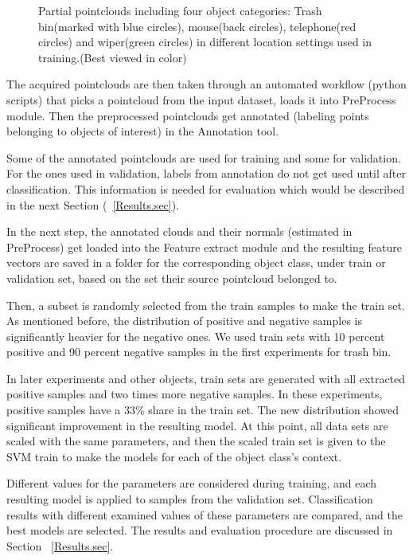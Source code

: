 \begin{figure} [htp]
\begin{center}
  \end{center}
  \caption[Train set pointclouds including four different object class.]
  {Partial pointclouds including four object categories: Trash bin(marked with blue circles), mouse(back circles), telephone(red circles) and wiper(green circles) in different location settings used in training.(Best viewed in color)}
  \label{TrainClouds2.figure:edge}
\end{figure}




The acquired pointclouds are then taken through an automated workflow (python scripts) that picks a pointcloud from the input dataset, loads it into PreProcess module. Then the preprocessed pointclouds get annotated (labeling points belonging to objects of interest) in the Annotation tool.

Some of the annotated pointclouds are used for training and some for validation. 
For the ones used in validation, labels from annotation do not get used until after classification. This information is needed for evaluation which would be described in the next Section (~\ref{Results.sec}).


In the next step, the annotated clouds and their normals (estimated in PreProcess) get loaded into the Feature extract module 
and the resulting feature vectors are saved in a folder for the corresponding object class, under train or validation set, based on the set their source pointcloud belonged to.

Then, a subset is randomly selected from the train samples to make the train set. As mentioned before, the distribution of positive and negative samples is significantly heavier for the negative ones. We used train sets with 10 percent positive and 90 percent negative samples in the first experiments for trash bin. 

In later experiments and other objects, train sets are generated with all extracted positive samples and two times more negative samples. In these experiments, positive samples have a 33\% share in the train set. The new distribution showed significant improvement in the resulting model. At this point, all data sets are scaled with the same parameters, and then the scaled train set is given to the SVM train to make the models for each of the object class's context. 


Different values for the parameters are considered during training, and each resulting model is applied to samples from the validation
set. Classification results with different examined values of these parameters are compared, and the best models are selected. 
The results and evaluation procedure are discussed in Section ~\ref{Results.sec}.

